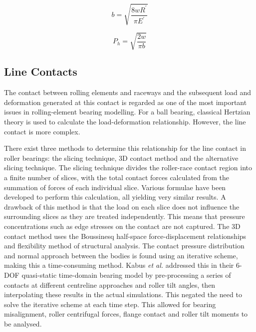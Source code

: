 \begin{equation}\label{eq2.3}
	b=\sqrt{\frac{8 w {R^{\prime}}}{\pi {E^{\prime}}}}
\end{equation}

\begin{equation}\label{eq2.4}
	P_h=\sqrt{\frac{2 w}{\pi b}}
\end{equation}

\subsection{Line Contacts}

The contact between rolling elements and raceways and the subsequent load and deformation generated at this contact is regarded as one of the most important issues in rolling-element bearing modelling. For a ball bearing, classical Hertzian theory is used to calculate the load-deformation relationship. However, the line contact is more complex.

There exist three methods to determine this relationship for the line contact in roller bearings: the slicing technique, 3D contact method and the alternative slicing technique. The slicing technique \cite{Andreason1973} divides the roller-race contact region into a finite number of slices, with the total contact forces calculated from the summation of forces of each individual slice. Various formulae have been developed to perform this calculation, all yielding very similar results. A drawback of this method is that the load on each slice does not influence the surrounding slices as they are treated independently. This means that pressure concentrations such as edge stresses on the contact are not captured. The 3D contact method uses the Boussinesq half-space force-displacement relationships and flexibility method of structural analysis. The contact pressure distribution and normal approach between the bodies is found using an iterative scheme, making this a time-consuming method. Kabus \textit{et al.} \cite{Kabus2012} addressed this in their 6-DOF quasi-static time-domain bearing model  by pre-processing a series of contacts at different centreline approaches  and roller tilt angles, then interpolating these results in the actual simulations. This negated the need to solve the iterative scheme at each time step. This allowed for bearing misalignment, roller centrifugal forces, flange contact and roller tilt moments to be analysed. 

